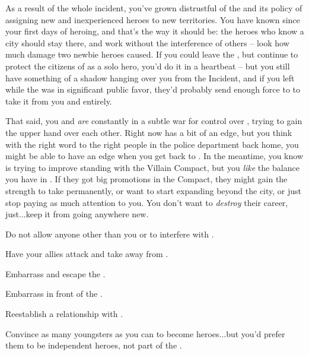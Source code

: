 \documentclass[char]{LRSguildcamp1}
\begin{document}
As a result of the whole incident, you've grown distrustful of the \cHeroLeague{\intro} and its policy of assigning new and inexperienced heroes to new territories.  You have known \pCityO{} since your first days of heroing, and that's the way it should be: the heroes who know a city should stay there, and work without the interference of others -- look how much damage two newbie heroes caused.  If you could leave the \cHeroLeague{}, but continue to protect the citizens of \pCityO{} as a solo hero, you'd do it in a heartbeat -- but you still have something of a shadow hanging over you from the \pCityO{} Incident, and if you left while the \cHeroLeague{} was in significant public favor, they'd probably send enough force to \pCityO{} to take it from you and \cOldest{} entirely.


That said, you and \cOldest{} \emph{are} constantly in a subtle war for control over \pCityO{}, trying to gain the upper hand over each other.  Right now \cOldest{} has a bit of an edge, but you think with the right word to the right people in the police department back home, you might be able to have an edge when you get back to \pCityO{}.  In the meantime, you know \cOldest{} is trying to improve \cOldest{\their} standing with the Villain Compact, but you {\em like} the balance you have in \pCityO{}.  If they got big promotions in the Compact, they might gain the strength to take \pCityO{} permanently, or want to start expanding beyond the city, or just stop paying as much attention to you.  You don't want to {\em destroy} their career, just...keep it from going anywhere new.

\begin{itemz}[Goals]
	\item Do not allow anyone other than you or \cOS{} to interfere with \pCityO{}.  %
	\item Have your allies attack and take \pCityO{} away from \cOldest{}.
	\item Embarrass and escape the \cHeroLeague{\intro}.
	\item Embarrass \cOldest{} in front of the \cVillainCompact{\intro}.
	\item Reestablish a relationship with \cGrad{}.
	\item Convince as many youngsters as you can to become heroes...but you'd prefer them to be independent heroes, not part of the \cHeroLeague{}.
\end{itemz}
\end{document}
